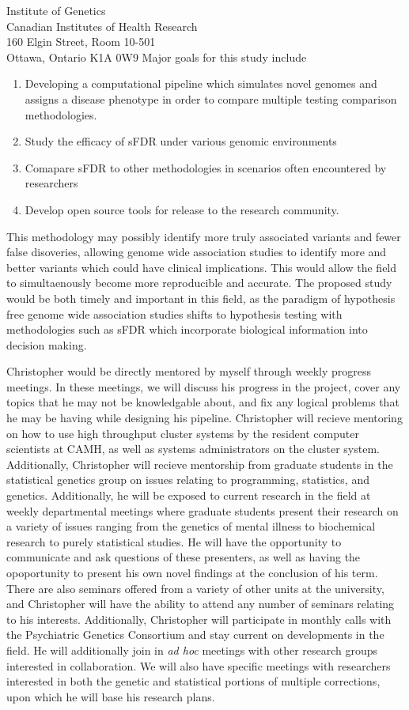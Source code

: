\documentclass{letter}
\begin{document}
\begin{letter}{Institute of Genetics \\ Canadian Institutes of Health Research \\ 160 Elgin Street, Room 10-501 \\ Ottawa, Ontario K1A 0W9}
Major goals for this study include

\begin{enumerate}
	\item Developing a computational pipeline which simulates novel genomes and assigns a disease phenotype in order to compare multiple testing comparison methodologies. 
	\item Study the efficacy of sFDR under various genomic environments
	\item Comapare sFDR to other methodologies in scenarios often encountered by researchers
	\item Develop open source tools for release to the research community.
\end{enumerate}

This methodology may possibly identify more truly associated variants and fewer false disoveries, allowing genome wide association studies to identify more and better variants which could have clinical implications. This would allow the field to simultaenously become more reproducible and accurate. The proposed study would be both timely and important in this field, as the paradigm of hypothesis free genome wide association studies shifts to hypothesis testing with methodologies such as sFDR which incorporate biological information into decision making. 

Christopher would be directly mentored by myself through weekly progress meetings. In these meetings, we will discuss his progress in the project, cover any topics that he may not be knowledgable about, and fix any logical problems that he may be having while designing his pipeline. Christopher will recieve mentoring on how to use high throughput cluster systems by the resident computer scientists at CAMH, as well as systems administrators on the cluster system. Additionally, Christopher will recieve mentorship from graduate students in the statistical genetics group on issues relating to programming, statistics, and genetics. Additionally, he will be exposed to current research in the field at weekly departmental meetings where graduate students present their research on a variety of issues ranging from the genetics of mental illness to biochemical research to purely statistical studies. He will have the opportunity to communicate and ask questions of these presenters, as well as having the opoportunity to present his own novel findings at the conclusion of his term.  There are also seminars offered from a variety of other units at the university, and Christopher will have the ability to attend any number of seminars relating to his interests. Additionally, Christopher will participate in monthly calls with the Psychiatric Genetics Consortium and stay current on developments in the field. He will additionally join in \textit{ad hoc} meetings with other research groups interested in collaboration. We will also have specific meetings with researchers interested in both the genetic and statistical portions of multiple corrections, upon which he will base his research plans. 


\end{letter}
\end{document}
